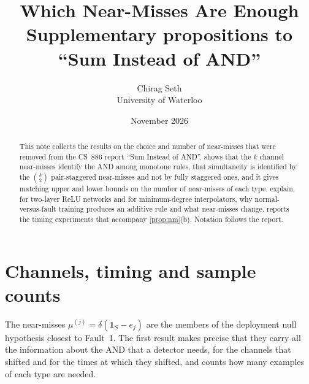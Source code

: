 \documentclass[11pt]{article}
\title{Which Near-Misses Are Enough\\[4pt]\large Supplementary propositions to ``Sum Instead of AND''}
\author{Chirag Seth\\University of Waterloo}
\date{November 2026}
\numberwithin{equation}{section}
\theoremstyle{plain}
\newcommand{\one}{\mathbf{1}}
\begin{document}
\maketitle

\begin{abstract}
This note collects the results on the choice and number of near-misses that were removed from the CS~886 report ``Sum Instead of AND''.  shows that the $k$ channel near-misses identify the AND among monotone rules, that simultaneity is identified by the $\binom k2$ pair-staggered near-misses and not by fully staggered ones, and it gives matching upper and lower bounds on the number of near-misses of each type.  explain, for two-layer ReLU networks and for minimum-degree interpolators, why normal-versus-fault training produces an additive rule and what near-misses change.  reports the timing experiments that accompany \cref{prop:nm}(b). Notation follows the report.
\end{abstract}

\section{Channels, timing and sample counts}\label{sec:prop}

The near-misses $\mu^{(j)}=\delta(\one_S-e_j)$ are the members of the deployment null hypothesis closest to Fault~1. The first result makes precise that they carry all the information about the AND that a detector needs, for the channels that shifted and for the times at which they shifted, and counts how many examples of each type are needed.
\end{document}
